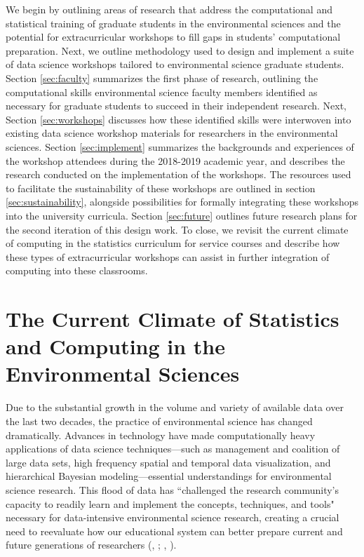 \documentclass[12pt]{article}
\begin{document}
\quad We begin by outlining areas of research that address the computational and
statistical training of graduate students in the environmental sciences and the 
potential for extracurricular workshops to fill gaps in students' computational 
preparation. Next, we outline methodology used to design and implement a suite
of data science workshops tailored to environmental science graduate students. 
Section \ref{sec:faculty} summarizes the first phase of research, outlining the
computational skills environmental science faculty members identified as
necessary for graduate students to succeed in their independent research. Next,
Section \ref{sec:workshops} discusses how these identified skills were
interwoven into existing data science workshop materials for researchers in the
environmental sciences. Section \ref{sec:implement} summarizes the backgrounds and experiences
of the workshop attendees during the 2018-2019 academic year, and describes the
research conducted on the implementation of the workshops. The resources used to 
facilitate the sustainability of these workshops are outlined in section 
\ref{sec:sustainability}, alongside possibilities for formally integrating these
workshops into the university curricula. Section \ref{sec:future} outlines
future research plans for the second iteration of this design work. To close, we
revisit the current climate of computing in the statistics curriculum for
service courses and describe how these types of extracurricular workshops can
assist in further integration of computing into these classrooms. 

\section{The Current Climate of Statistics and Computing in the Environmental 
Sciences}
\label{sec:lit}

\quad Due to the substantial growth in the volume and variety of available data 
over the last two decades, the practice of environmental science has changed 
dramatically. Advances in technology have made computationally heavy 
applications of data science techniques---such as management and coalition of 
large data sets, high frequency spatial and temporal data visualization, and 
hierarchical Bayesian modeling---essential understandings for environmental 
science research. This flood of data has ``challenged the research community's 
capacity to readily learn and implement the concepts, techniques, and tools" 
\citep[p.\ 546]{hampton} necessary for data-intensive environmental science 
research, creating a crucial need to reevaluate how our educational system can
better prepare current and future generations of researchers 
(\citeauthor{green}, \citeyear{green}; \citeauthor{hampton}, 
\citeyear{hampton}).  
\end{document}
